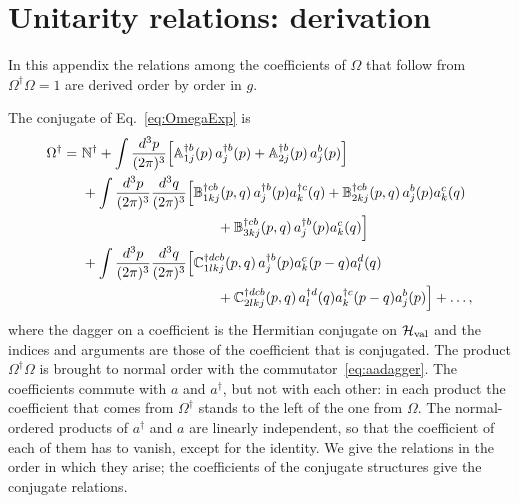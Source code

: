 \section{Unitarity relations: derivation}\label{app:unitarity}

In this appendix the relations among the coefficients of $\Omega$ that follow from $\Omega^\dagger\Omega=1$ are derived order by order in $g$.

The conjugate of Eq.~\eqref{eq:OmegaExp} is
\begin{align}\label{eq:OmegaDag}
\Omega^\dagger = \ &\mf{N}^\dagger
+\int\frac{d^3p}{(2\pi)^3}\Big[\mf{A}^{\dagger b}_{1j}(p)\,a^{\dagger b}_j(p)+\mf{A}^{\dagger b}_{2j}(p)\,a^{b}_j(p)\Big]
\notag\\&
+\int\frac{d^3p}{(2\pi)^3}\frac{d^3q}{(2\pi)^3}\Big[\mf{B}^{\dagger cb}_{1kj}(p,q)\,a^{\dagger b}_j(p)a^{\dagger c}_k(q)+\mf{B}^{\dagger cb}_{2kj}(p,q)\,a^{b}_j(p)a^{c}_k(q)
\notag\\&\hspace{3.4cm}+\mf{B}^{\dagger cb}_{3kj}(p,q)\,a^{\dagger b}_j(p)a^{c}_k(q)\Big]
\notag\\&
+\int\frac{d^3p}{(2\pi)^3}\frac{d^3q}{(2\pi)^3}\Big[\mf{C}^{\dagger dcb}_{1lkj}(p,q)\,a^{\dagger b}_j(p)a^{c}_k(p-q)a^{d}_l(q)
\notag\\&\hspace{3.4cm}+\mf{C}^{\dagger dcb}_{2lkj}(p,q)\,a^{\dagger d}_l(q)a^{\dagger c}_k(p-q)a^{b}_j(p)\Big]+\dots,
\end{align}
where the dagger on a coefficient is the Hermitian conjugate on $\mathcal H_{\rm val}$ and the indices and arguments are those of the coefficient that is conjugated. The product $\Omega^\dagger\Omega$ is brought to normal order with the commutator~\eqref{eq:aadagger}. The coefficients commute with $a$ and $a^\dagger$, but not with each other: in each product the coefficient that comes from $\Omega^\dagger$ stands to the left of the one from $\Omega$. The normal-ordered products of $a^\dagger$ and $a$ are linearly independent, so that the coefficient of each of them has to vanish, except for the identity. We give the relations in the order in which they arise; the coefficients of the conjugate structures give the conjugate relations.

